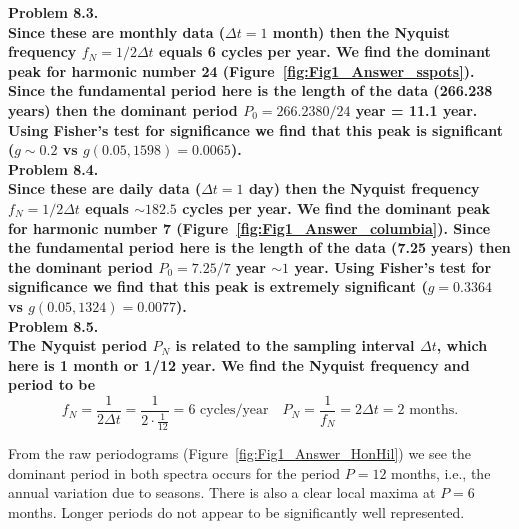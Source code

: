 \noindent
\bf{Problem 8.3.} \\

Since these are monthly data ($\Delta t = 1$ month) then the Nyquist frequency $f_N = 1/2\Delta t$ equals
6 cycles per year.  We find the dominant peak for harmonic number 24 (Figure~\ref{fig:Fig1_Answer_sspots}).  Since the fundamental period here
is the length of the data (266.238 years) then the dominant period $P_0 = 266.2380/24$ year = 11.1 year. Using Fisher's
test for significance we find that this peak is significant ($g \sim 0.2$ vs $g(0.05,1598) = 0.0065$). \\


\noindent
\bf{Problem 8.4.} \\

Since these are daily data ($\Delta t = 1$ day) then the Nyquist frequency $f_N = 1/2\Delta t$ equals
$\sim 182.5$ cycles per year.  We find the dominant peak for harmonic number 7 (Figure~\ref{fig:Fig1_Answer_columbia}).
Since the fundamental period here
is the length of the data (7.25 years) then the dominant period $P_0 = 7.25/7$ year $\sim 1$ year. Using Fisher's
test for significance we find that this peak is extremely significant ($g = 0.3364$ vs $g(0.05,1324) = 0.0077$). \\


\noindent
\bf{Problem 8.5.} \\

The Nyquist period $P_N$ is related to the sampling interval $\Delta t$, which here is 1 month or 1/12 year.
We find the Nyquist frequency and period to be
$$
f_N = \frac{1}{2 \Delta t} = \frac{1}{2 \cdot \frac{1}{12}} = 6 \mbox{ cycles/year}
\quad P_N = \frac{1}{f_N} = 2\Delta t = 2 \mbox{ months.}
$$

From the raw periodograms (Figure~\ref{fig:Fig1_Answer_HonHil}) we see the dominant period in both spectra occurs for the period $P = 12$ months,
i.e., the annual variation due to seasons.  There is also a clear local maxima at $P = 6$ months.  Longer periods
do not appear to be significantly well represented.


